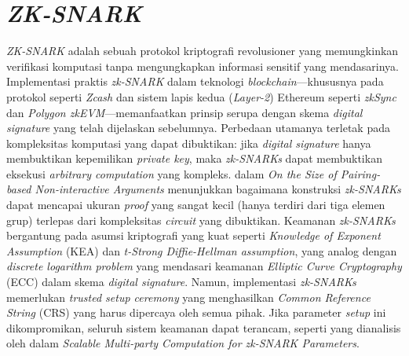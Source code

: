 \section{\emph{ZK-SNARK}}
\emph{ZK-SNARK} adalah sebuah protokol kriptografi revolusioner yang memungkinkan verifikasi komputasi tanpa mengungkapkan informasi sensitif yang mendasarinya. Implementasi praktis \emph{zk-SNARK} dalam teknologi \emph{blockchain}—khususnya pada protokol seperti \emph{Zcash} dan sistem lapis kedua (\emph{Layer-2}) Ethereum seperti \emph{zkSync} dan \emph{Polygon zkEVM}—memanfaatkan prinsip serupa dengan skema \emph{digital signature} yang telah dijelaskan sebelumnya. Perbedaan utamanya terletak pada kompleksitas komputasi yang dapat dibuktikan: jika \emph{digital signature} hanya membuktikan kepemilikan \emph{private key}, maka \emph{zk-SNARKs} dapat membuktikan eksekusi \emph{arbitrary computation} yang kompleks. \textcite{groth2016size} dalam \emph{On the Size of Pairing-based Non-interactive Arguments} menunjukkan bagaimana konstruksi \emph{zk-SNARKs} dapat mencapai ukuran \emph{proof} yang sangat kecil (hanya terdiri dari tiga elemen grup) terlepas dari kompleksitas \emph{circuit} yang dibuktikan. Keamanan \emph{zk-SNARKs} bergantung pada asumsi kriptografi yang kuat seperti \emph{Knowledge of Exponent Assumption} (KEA) dan \emph{t-Strong Diffie-Hellman assumption}, yang analog dengan \emph{discrete logarithm problem} yang mendasari keamanan \emph{Elliptic Curve Cryptography} (ECC) dalam skema \emph{digital signature}. Namun, implementasi \emph{zk-SNARKs} memerlukan \emph{trusted setup ceremony} yang menghasilkan \emph{Common Reference String} (CRS) yang harus dipercaya oleh semua pihak. Jika parameter \emph{setup} ini dikompromikan, seluruh sistem keamanan dapat terancam, seperti yang dianalisis oleh \textcite{bowe2017scalable} dalam \emph{Scalable Multi-party Computation for zk-SNARK Parameters}.

